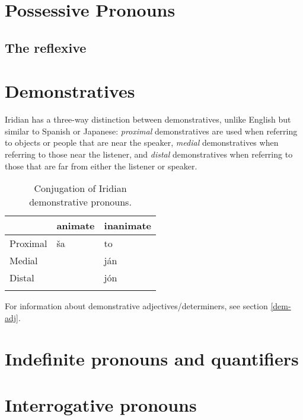 \section{Possessive Pronouns}

\subsection{The reflexive }

\section{Demonstratives}

Iridian has a three-way distinction between demonstratives, unlike English but similar to Spanish or Japanese: \emph{proximal} demonstratives are used when referring to objects or people that are near the speaker, \emph{medial} demonstratives when referring to those near the listener, and \emph{distal} demonstratives when referring to those that are far from either the listener or speaker.






\begin{table}[h!]
	\small\centering
	\caption{Conjugation of Iridian demonstrative pronouns.}
	\begin{tabu}to 0.7\textwidth{YMM}
		\toprule
						& {\sc animate}		& {\sc inanimate}\\
		\midrule
		Proximal		& \v{s}a			& to\\ \addlinespace
		Medial			&&j\'an\\ \addlinespace
		Distal			&&j\'on\\ \addlinespace
		\bottomrule
	\end{tabu}
\end{table}

For information about demonstrative adjectives/determiners, see section \ref{dem-adj}.

\section{Indefinite pronouns and quantifiers}


\section{Interrogative pronouns}

